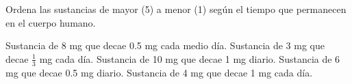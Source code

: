 \begin{parts}


    Ordena las sustancias de mayor (5) a menor (1) según el tiempo que permanecen en el cuerpo humano.

    \begin{choices}
        \choice \fillin[200][0.5cm] Sustancia de 8 mg que decae 0.5 mg cada medio día.
        \choice \fillin[200][0.5cm] Sustancia de 3 mg que decae $\frac{1}{3}$ mg cada día.
        \choice \fillin[200][0.5cm] Sustancia de 10 mg que decae 1 mg diario.
        \choice \fillin[200][0.5cm] Sustancia de 6 mg que decae 0.5 mg diario.
        \choice \fillin[200][0.5cm] Sustancia de 4 mg que decae 1 mg cada día.
    \end{choices}

\end{parts}
